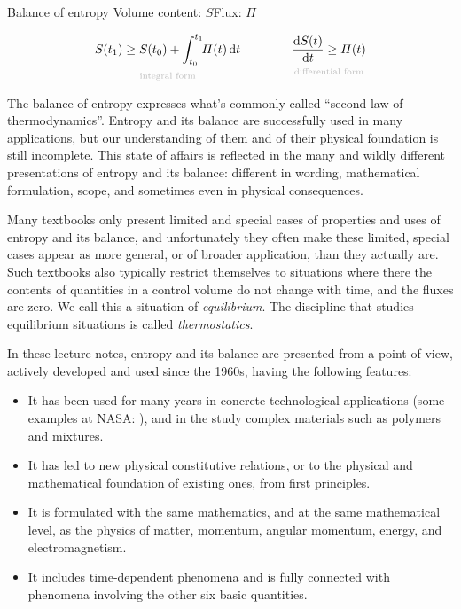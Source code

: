 \documentclass[a4paper,12pt,%
onecolumn,oneside,titlepage,%
british%
]{memoir}
\newcommand*{\di}{\mathrm{d}}%
\renewcommand*{\|}[1][]{\nonscript\:#1\vert\nonscript\:\mathopen{}}
\newcommand*{\yS}{S}
\newcommand*{\yB}{\varPi}
\newcommand*{\yti}{t_{0}}
\newcommand*{\ytf}{t_{1}}
\begin{document}
\begin{definition}{Balance of entropy}
  Volume content: $\yS$\qquad Flux: $\yB$


  \begin{equation}
    \label{eq:bal_entropy}
      \underbracket[0pt]{\yS(\ytf) \ge \yS(\yti) + \int_{\yti}^{\ytf}\!\!\yB(t)\,\di t}_{\mathclap{\text{\color{grey}integral form}}}
      \qquad%
      \qquad
      \underbracket[0pt]{\frac{\di\yS(t)}{\di t} \ge \yB(t)}_{\mathclap{\text{\color{grey}differential form}}}
  \end{equation}
\end{definition}


The balance of entropy expresses what's commonly called \enquote{second law of thermodynamics}. Entropy and its balance are successfully used in many applications, but our understanding of them and of their physical foundation is still incomplete. This state of affairs is reflected in the many and wildly different presentations of entropy and its balance: different in wording, mathematical formulation, scope, and sometimes even in physical consequences.

Many textbooks only present limited and special cases of properties and uses of entropy and its balance, and unfortunately they often make these limited, special cases appear as more general, or of broader application, than they actually are. Such textbooks also typically restrict themselves to situations where there the contents of quantities in a control volume do not change with time, and the fluxes are zero. We call this a situation of \emph{equilibrium}. The discipline that studies equilibrium situations is called \emph{thermostatics}.

In these lecture notes, entropy and its balance are presented from a point of view, actively developed and used since the 1960s, having the following features:
\begin{itemize}[nosep]
\item It has been used for many years in concrete technological applications (some examples at NASA: \cites{changetal1971,hughesetal1986,turonetal2004,diosadyetal2018,katoetal2020}),
  and in the study complex materials such as polymers and mixtures.
\item It has led to new physical constitutive relations, or to the physical and mathematical foundation of existing ones, from first principles.
\item It is formulated with the same mathematics, and at the same mathematical level, as the physics of matter, momentum, angular momentum, energy, and electromagnetism.
\item It includes time-dependent phenomena and is fully connected with phenomena involving the other six basic quantities.
\end{itemize}
\end{document}
